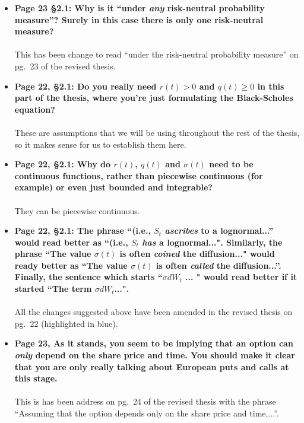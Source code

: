 \documentclass{article}
\begin{document}
\begin{enumerate}
\begin{itemize}
			We simply used the terminology that was given as the title in~\cite{Wilmott1993}, which has in \S6.2.3 the title of \emph{discrete dividend payments}. The value  $q_d$ itself is referred to as the \emph{yield}. 
			
			\item{\textbf{Page 23 \S2.1: Why is it ``under \emph{any} risk-neutral probability measure''? Surely in this case there is only one risk-neutral measure?\\\\}}
			This has been change to read ``under the risk-neutral probability measure'' on pg.~23 of the revised thesis.
			
			\item{\textbf{Page 22, \S2.1: Do you really need $r(t) > 0$ and $q(t) \geq 0$ in this part of the thesis, where you're just formulating the Black-Scholes equation?\\\\}}
			These are assumptions that we will be using throughout the rest of the thesis, so it makes sense for us to establish them here.
			
			\item{\textbf{Page 22, \S2.1: Why do $r(t)$, $q(t)$ and $\sigma(t)$ need to be continuous functions, rather than piecewise continuous (for example) or even just bounded and integrable?\\\\}}
			They can be piecewise continuous.
			
			\item{\textbf{Page 22, \S2.1: The phrase ``(i.e., $S_t$ \emph{ascribes} to a lognormal...'' would read better as ``(i.e., $S_t$ \emph{has} a lognormal...". Similarly, the phrase ``The value $\sigma(t)$ is often \emph{coined} the diffusion..." would ready better as ``The value $\sigma(t)$ is often \emph{called} the diffusion...''. Finally, the sentence which starts ``$\sigma dW_t$ ... " would read better if it started ``The term $\sigma dW_t$...".\\\\}}
			All the changes suggested above have been amended in the revised thesis on pg.~22 (highlighted in blue).
			
			\item{\textbf{Page 23, As it stands, you seem to be implying that an option can \emph{only} depend on the share price and time. You should make it clear that you are only really talking about European puts and calls at this stage.\\\\}}
			This is has been address on pg.~24 of the revised thesis with the phrase ``Assuming that the option depends only on the share price and time,...''.
			

\end{itemize}
\end{enumerate}
\end{document}
